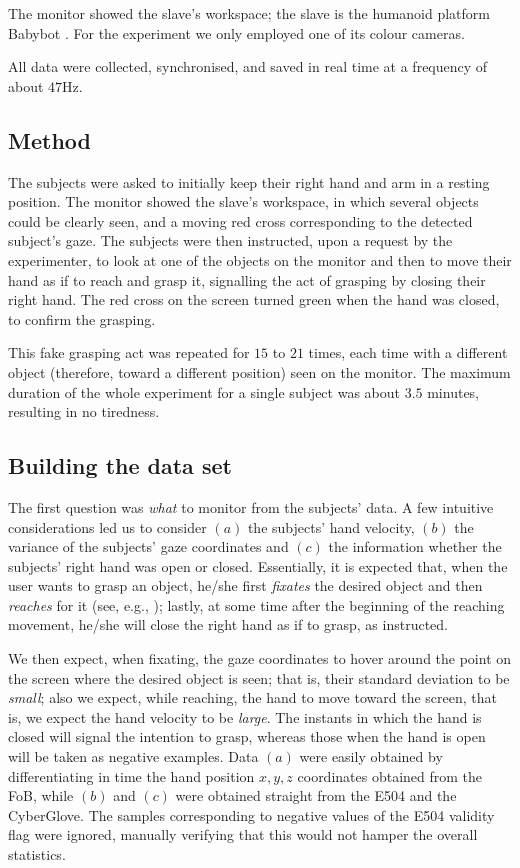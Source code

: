 \documentclass[a4paper,10pt,conference]{ieeeconf}
\begin{document}
The monitor showed the slave's workspace; the slave is the humanoid
platform Babybot \cite{babybotHum2005}. For the experiment we only
employed one of its colour cameras.

All data were collected, synchronised, and saved in real time at a
frequency of about $47$Hz.

\subsection{Method}

The subjects were asked to initially keep their right hand and arm in
a resting position. The monitor showed the slave's workspace, in which
several objects could be clearly seen, and a moving red cross
corresponding to the detected subject's gaze. The subjects were then
instructed, upon a request by the experimenter, to look at one of the
objects on the monitor and then to move their hand as if to reach and
grasp it, signalling the act of grasping by closing their right
hand. The red cross on the screen turned green when the hand was
closed, to confirm the grasping.

This fake grasping act was repeated for $15$ to $21$ times, each time
with a different object (therefore, toward a different position) seen
on the monitor. The maximum duration of the whole experiment for a
single subject was about $3.5$ minutes, resulting in no tiredness.

\subsection{Building the data set}
\label{subsec:dataset}

The first question was \emph{what} to monitor from the subjects'
data. A few intuitive considerations led us to consider $(a)$ the
subjects' hand velocity, $(b)$ the variance of the subjects' gaze
coordinates and $(c)$ the information whether the subjects' right hand
was open or closed. Essentially, it is expected that, when the user
wants to grasp an object, he/she first \emph{fixates} the desired
object and then \emph{reaches} for it (see, e.g., \cite{johansson01});
lastly, at some time after the beginning of the reaching movement,
he/she will close the right hand as if to grasp, as instructed.

We then expect, when fixating, the gaze coordinates to hover around
the point on the screen where the desired object is seen; that is,
their standard deviation to be \emph{small}; also we expect, while
reaching, the hand to move toward the screen, that is, we expect the
hand velocity to be \emph{large}. The instants in which the hand is
closed will signal the intention to grasp, whereas those when the hand
is open will be taken as negative examples. Data $(a)$ were easily
obtained by differentiating in time the hand position $x,y,z$
coordinates obtained from the FoB, while $(b)$ and $(c)$ were obtained
straight from the E504 and the CyberGlove. The samples corresponding
to negative values of the E504 validity flag were ignored, manually
verifying that this would not hamper the overall statistics.
\end{document}
